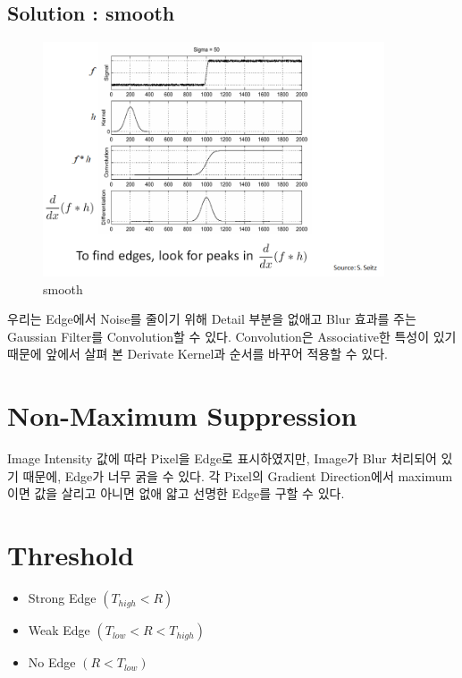 \documentclass[]{report}
\begin{document}
\subsection{Solution : smooth}

\begin{figure}[ht!]
	\centering
	\includegraphics[width=0.9\textwidth]{image/1-4.png}
	\caption{smooth}
	\label{1-4}
\end{figure}

우리는 Edge에서 Noise를 줄이기 위해 Detail 부분을 없애고 Blur 효과를 주는 Gaussian Filter를 Convolution할 수 있다. Convolution은 Associative한 특성이 있기 때문에 앞에서 살펴 본 Derivate Kernel과 순서를 바꾸어 적용할 수 있다. \\



\section{Non-Maximum Suppression}

Image Intensity 값에 따라 Pixel을 Edge로 표시하였지만, Image가 Blur 처리되어 있기 때문에, Edge가 너무 굵을 수 있다. 각 Pixel의 Gradient Direction에서 maximum이면 값을 살리고 아니면 없애 얇고 선명한 Edge를 구할 수 있다. \\

\section{Threshold}

\begin{itemize}
	\item Strong Edge $( T_{high} < R )$
	\item Weak Edge $(T_{low} < R < T_{high})$
	\item No Edge $(R < T_{low})$
\end{itemize} 
\end{document}
